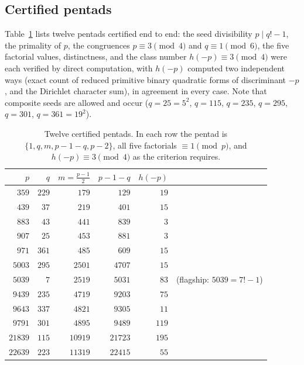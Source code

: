 \documentclass[11pt]{article}
\theoremstyle{definition}
\theoremstyle{remark}
\begin{document}
\subsection{Certified pentads}

Table~\ref{tab:pentads} lists twelve pentads certified end to end: the seed
divisibility $p \mid q!-1$, the primality of $p$, the congruences
$p \equiv 3 \pmod 4$ and $q \equiv 1 \pmod 6$, the five factorial values,
distinctness, and the class number $h(-p) \equiv 3 \pmod 4$ were each
verified by direct computation, with $h(-p)$ computed two independent ways
(exact count of reduced primitive binary quadratic forms of discriminant
$-p$, and the Dirichlet character sum), in agreement in every case. Note
that composite seeds are allowed and occur ($q = 25 = 5^2$, $q = 115$,
$q = 235$, $q = 295$, $q = 301$, $q = 361 = 19^2$).

\begin{table}[ht]
\centering
\begin{tabular}{rrrrrr}
\hline
$p$ & $q$ & $m = \frac{p-1}{2}$ & $p-1-q$ & $h(-p)$ & \\
\hline
$359$   & $229$ & $179$   & $129$   & $19$  & \\
$439$   & $37$  & $219$   & $401$   & $15$  & \\
$883$   & $43$  & $441$   & $839$   & $3$   & \\
$907$   & $25$  & $453$   & $881$   & $3$   & \\
$971$   & $361$ & $485$   & $609$   & $15$  & \\
$5003$  & $295$ & $2501$  & $4707$  & $15$  & \\
$5039$  & $7$   & $2519$  & $5031$  & $83$  & (flagship: $5039 = 7!-1$) \\
$9439$  & $235$ & $4719$  & $9203$  & $75$  & \\
$9643$  & $337$ & $4821$  & $9305$  & $11$  & \\
$9791$  & $301$ & $4895$  & $9489$  & $119$ & \\
$21839$ & $115$ & $10919$ & $21723$ & $195$ & \\
$22639$ & $223$ & $11319$ & $22415$ & $55$  & \\
\hline
\end{tabular}
\caption{Twelve certified pentads. In each row the pentad is
$\{1, q, m, p-1-q, p-2\}$, all five factorials $\equiv 1 \pmod p$, and
$h(-p) \equiv 3 \pmod 4$ as the criterion requires.}
\label{tab:pentads}
\end{table}
\end{document}
